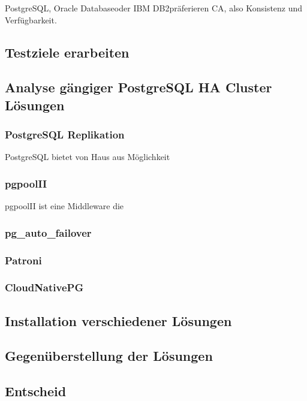 \Gls{PostgreSQL}, \Gls{Oracle Database}oder \Gls{IBM DB2}präferieren CA, also Konsistenz und Verfügbarkeit.

\subsection{Testziele erarbeiten}
\subsection{Analyse gängiger PostgreSQL HA Cluster Lösungen}
\subsubsection{PostgreSQL Replikation}
PostgreSQL bietet von Haus aus Möglichkeit
\subsubsection{pgpoolII}
pgpoolII ist eine Middleware die
\subsubsection{pg\_auto\_failover}
\subsubsection{Patroni}
\subsubsection{CloudNativePG}
\subsection{Installation verschiedener Lösungen}
\subsection{Gegenüberstellung der Lösungen}
\subsection{Entscheid}
